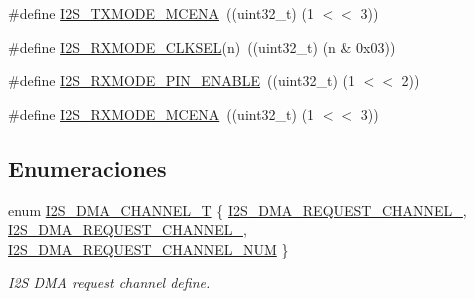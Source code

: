 \begin{DoxyCompactItemize}
\item 
\#define \hyperlink{group___i2_s__18_x_x__43_x_x_gabd67f37d51f2557f49fa600abb48225b}{I2\+S\+\_\+\+T\+X\+M\+O\+D\+E\+\_\+\+M\+C\+E\+NA}~((uint32\+\_\+t) (1 $<$$<$ 3))
\item 
\#define \hyperlink{group___i2_s__18_x_x__43_x_x_ga45351ee42b08814f1860c0d2a73379f0}{I2\+S\+\_\+\+R\+X\+M\+O\+D\+E\+\_\+\+C\+L\+K\+S\+EL}(n)~((uint32\+\_\+t) (n \& 0x03))
\item 
\#define \hyperlink{group___i2_s__18_x_x__43_x_x_ga2734ec0ee02ee7865c36b6ec3ffff081}{I2\+S\+\_\+\+R\+X\+M\+O\+D\+E\+\_\+P\+I\+N\+\_\+\+E\+N\+A\+B\+LE}~((uint32\+\_\+t) (1 $<$$<$ 2))
\item 
\#define \hyperlink{group___i2_s__18_x_x__43_x_x_ga64eb87a1f090271b07c7110f974f8300}{I2\+S\+\_\+\+R\+X\+M\+O\+D\+E\+\_\+\+M\+C\+E\+NA}~((uint32\+\_\+t) (1 $<$$<$ 3))
\end{DoxyCompactItemize}
\subsection*{Enumeraciones}
\begin{DoxyCompactItemize}
\item 
enum \hyperlink{group___i2_s__18_x_x__43_x_x_gac04c1583101ddd661886d9677683421b}{I2\+S\+\_\+\+D\+M\+A\+\_\+\+C\+H\+A\+N\+N\+E\+L\+\_\+T} \{ \hyperlink{group___i2_s__18_x_x__43_x_x_ggac04c1583101ddd661886d9677683421ba549b2d28b5da72f6185d736f5fed51c1}{I2\+S\+\_\+\+D\+M\+A\+\_\+\+R\+E\+Q\+U\+E\+S\+T\+\_\+\+C\+H\+A\+N\+N\+E\+L\+\_}, 
\hyperlink{group___i2_s__18_x_x__43_x_x_ggac04c1583101ddd661886d9677683421ba65eabb50f670f1dcae7b3c790f088e16}{I2\+S\+\_\+\+D\+M\+A\+\_\+\+R\+E\+Q\+U\+E\+S\+T\+\_\+\+C\+H\+A\+N\+N\+E\+L\+\_}, 
\hyperlink{group___i2_s__18_x_x__43_x_x_ggac04c1583101ddd661886d9677683421bab9921186ab93fee889b2074d508b88ce}{I2\+S\+\_\+\+D\+M\+A\+\_\+\+R\+E\+Q\+U\+E\+S\+T\+\_\+\+C\+H\+A\+N\+N\+E\+L\+\_\+\+N\+UM}
 \}\begin{DoxyCompactList}\small\item\em I2S D\+MA request channel define. \end{DoxyCompactList}
\end{DoxyCompactItemize}

